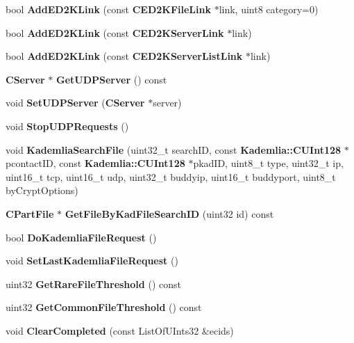 \begin{DoxyCompactItemize}
\item 
bool {\bfseries AddED2KLink} (const {\bf CED2KFileLink} $\ast$link, uint8 category=0)\label{classCDownloadQueue_aa5b9ec1336befdb50af2276a211ba3bc}

\item 
bool {\bfseries AddED2KLink} (const {\bf CED2KServerLink} $\ast$link)\label{classCDownloadQueue_ac96e29b620024601bd50ad8848585fc1}

\item 
bool {\bfseries AddED2KLink} (const {\bf CED2KServerListLink} $\ast$link)\label{classCDownloadQueue_a5e201512f91fa4b85dafad118dda3dee}

\item 
{\bf CServer} $\ast$ {\bf GetUDPServer} () const \label{classCDownloadQueue_a0a384df23ba8e9c428f1018b057057ed}

\item 
void {\bf SetUDPServer} ({\bf CServer} $\ast$server)\label{classCDownloadQueue_ab83f2fd149fd24af359cb46976bedb64}

\item 
void {\bf StopUDPRequests} ()\label{classCDownloadQueue_a8fdebf5825fc616ba8f937e0f634b4ad}

\item 
void {\bf KademliaSearchFile} (uint32\_\-t searchID, const {\bf Kademlia::CUInt128} $\ast$pcontactID, const {\bf Kademlia::CUInt128} $\ast$pkadID, uint8\_\-t type, uint32\_\-t ip, uint16\_\-t tcp, uint16\_\-t udp, uint32\_\-t buddyip, uint16\_\-t buddyport, uint8\_\-t byCryptOptions)\label{classCDownloadQueue_a418f5a92095e039bf3d308b76c037472}

\item 
{\bf CPartFile} $\ast$ {\bfseries GetFileByKadFileSearchID} (uint32 id) const \label{classCDownloadQueue_a9ae57a959c3a3612ebab19a3b8f025ef}

\item 
bool {\bfseries DoKademliaFileRequest} ()\label{classCDownloadQueue_af0efcc4e72b91563a8b853e4782495a2}

\item 
void {\bfseries SetLastKademliaFileRequest} ()\label{classCDownloadQueue_a2c51372e735cc87f22fd37c9ae176d20}

\item 
uint32 {\bfseries GetRareFileThreshold} () const \label{classCDownloadQueue_aad21042258a3215d0e9c377338cd199d}

\item 
uint32 {\bfseries GetCommonFileThreshold} () const \label{classCDownloadQueue_af34fbf31ae55da0f3bd89d4cb1b384c9}

\item 
void {\bf ClearCompleted} (const ListOfUInts32 \&ecids)\label{classCDownloadQueue_a1abb30d2257f28ecc1b408d60d723faa}

\end{DoxyCompactItemize}
